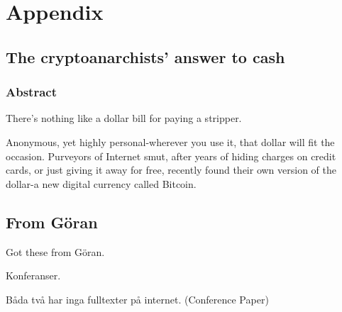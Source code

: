 \documentclass[a4paper,11pt,exjobb]{kth-mag}
\begin{document}
\cleardoublepage
\printbibliography


\cleardoublepage
\appendix
\pagestyle{empty}
\chapter{Appendix}
\section{The cryptoanarchists' answer to cash}
\subsection{Abstract}
\label{app:abstract}
There's nothing like a dollar bill for paying a stripper. 

Anonymous, yet highly personal-wherever you use it, that dollar will fit the occasion. Purveyors of Internet smut, after years of hiding charges on credit cards, or just giving it away for free, recently found their own version of the dollar-a new digital currency called Bitcoin.

\section{From Göran}
Got these from Göran\cite{goran1, goran2}.

Konferanser.

Båda två har inga fulltexter på internet. (Conference Paper)\cite{goran2}

\end{document}
